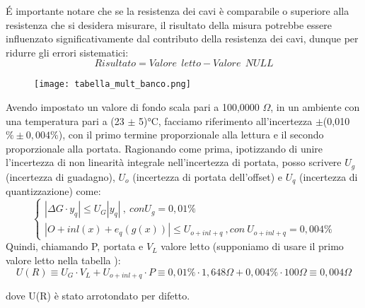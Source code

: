 \'E importante notare che se la resistenza dei cavi è comparabile o superiore alla resistenza che si desidera misurare, il risultato della misura potrebbe essere influenzato significativamente dal contributo della resistenza dei cavi, dunque per ridurre gli errori sistematici:
\begin{equation}
    Risultato = Valore \ \ letto - Valore\ \ NULL
\end{equation}

\begin{figure}[h]
    \centering
    \texttt{[image: tabella\_mult\_banco.png]}
    \label{fig:tab_mult_banco}
\end{figure}
\FloatBarrier

Avendo impostato un valore di fondo scala pari a 100,0000 $\Omega$, in un ambiente con una temperatura pari a (23 $\pm$ 5)°C, facciamo riferimento all'incertezza $\pm$(0,010 $\% \pm 0,004 \%$), con il primo termine proporzionale alla lettura e il secondo proporzionale alla portata.
Ragionando come prima, ipotizzando di unire l'incertezza di non linearità integrale nell'incertezza di portata, posso scrivere $U_g$ (incertezza di guadagno), $U_o$ (incertezza di portata dell'offset) e $U_q$ (incertezza di quantizzazione) come: 
\begin{equation}
\left\{\begin{array}{l}
| \Delta G \cdot y_q | \leq U_G |y_q| \ , \ con U_g=0,01\% \\ 
| O + inl(x) + e_q(g(x)) | \leq U_{o+inl+q} \ , con \ U_{o+inl+q}=0,004\%
\end{array}\right.
\end{equation}
Quindi, chiamando P, portata e $V_L$ valore letto (supponiamo di usare il primo valore letto nella tabella \label{mult_port}):
\begin{equation*}
    U(R) \equiv U_G \cdot V_L + U_{o+inl+q} \cdot P \equiv 0,01\% \cdot 1,648\Omega + 0,004 \% \cdot 100 \Omega \equiv 0,004 \Omega 
\end{equation*}

dove U(R) è stato arrotondato per difetto.

